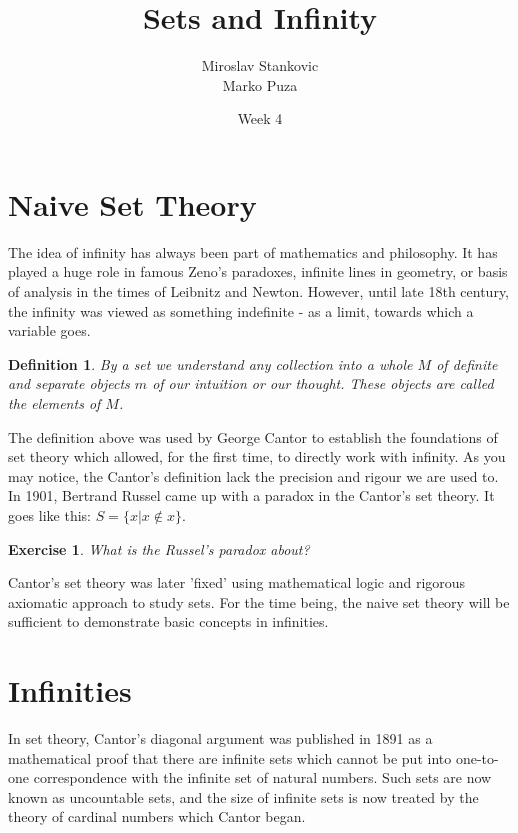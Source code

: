 \documentclass[11pt,a5paper]{article}
\title{\textbf{Sets and Infinity}}
\date{Week 4}
\author{Miroslav Stankovic\\ \tiny{Marko Puza}}
\newtheorem{definition}{Definition}
\newtheorem{exercise}{Exercise}
\begin{document}
\maketitle




\section{Naive Set Theory}

The idea of infinity has always been part of mathematics and philosophy. It has played a huge role in famous Zeno's paradoxes, infinite lines in geometry, or basis of analysis in the times of Leibnitz and Newton. However, until late 18th century, the infinity was viewed as something indefinite - as a limit, towards which a variable goes.

\begin{definition}
By a \emph{set} we understand any collection into a whole $M$ of definite and separate objects $m$ of our intuition or our thought. These objects are called the \emph{elements} of $M$.
\end{definition}

\noindent The definition above was used by George Cantor to establish the foundations of set theory which allowed, for the first time, to directly work with infinity. As you may notice, the Cantor's definition lack the precision and rigour we are used to. In 1901, Bertrand Russel came up with a paradox in the Cantor's set theory. It goes like this: $S=\{x|x\notin x\}$.

\begin{exercise} What is the Russel's paradox about?
\end{exercise}

\noindent Cantor's set theory was later 'fixed' using mathematical logic and rigorous axiomatic approach to study sets. For the time being, the naive set theory will be sufficient to demonstrate basic concepts in infinities.

\section{Infinities}

\noindent In set theory, Cantor's diagonal argument was published in 1891 as a mathematical proof that there are infinite sets which cannot be put into one-to-one correspondence with the infinite set of natural numbers. Such sets are now known as uncountable sets, and the size of infinite sets is now treated by the theory of cardinal numbers which Cantor began. 
\end{document}
